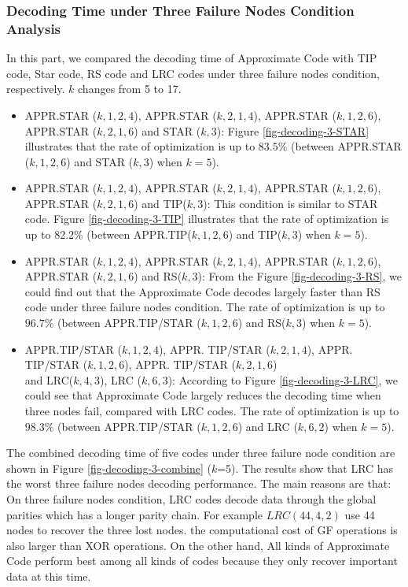 \documentclass[sigconf]{acmart}
\begin{document}
\subsubsection{Decoding Time under Three Failure Nodes Condition Analysis}
In this part, we compared the decoding time of Approximate Code with TIP code, Star code, RS code and LRC codes under three failure nodes condition, respectively. $k$ changes from 5 to 17. 
\begin{itemize}
    \item APPR.STAR ($k,1,2,4$), APPR.STAR ($k,2,1,4$), APPR.STAR ($k,1,2,6$), APPR.STAR ($k,2,1,6$) and STAR ($k,3$): Figure \ref{fig-decoding-3-STAR} illustrates that the rate of optimization is up to $83.5\%$ (between APPR.STAR ($k,1,2,6$) and STAR ($k,3$) when $k = 5$). 
    \item APPR.STAR ($k,1,2,4$), APPR.STAR ($k,2,1,4$), APPR.STAR ($k,1,2,6$), APPR.STAR ($k,2,1,6$) and TIP($k,3$): This condition is similar to STAR code. Figure \ref{fig-decoding-3-TIP} illustrates that the rate of optimization is up to 82.2\% (between APPR.TIP($k,1,2,6$) and TIP($k,3$) when $k = 5$).
    \item APPR.STAR ($k,1,2,4$), APPR.STAR ($k,2,1,4$), APPR.STAR ($k,1,2,6$), APPR.STAR ($k,2,1,6$) and RS($k,3$): From the Figure \ref{fig-decoding-3-RS}, we could find out that the Approximate Code decodes largely faster than RS code under three failure nodes condition. The rate of optimization is up to $96.7\%$ (between APPR.TIP/STAR ($k,1,2,6$) and RS($k,3$) when $k = 5$).
    \item APPR.TIP/STAR ($k,1,2,4$), APPR. TIP/STAR ($k,2,1,4$), APPR. TIP/STAR ($k,1,2,6$), APPR. TIP/STAR ($k,2,1,6$)  \\
    and LRC($k,4,3$), LRC ($k,6,3$): 
    According to Figure \ref{fig-decoding-3-LRC}, we could see that Approximate Code largely reduces the decoding time when three nodes fail, compared with LRC codes. The rate of optimization is up to $98.3\%$  (between APPR.TIP/STAR ($k,1,2,6$) and LRC ($k, 6, 2$) when $k = 5$).
\end{itemize}

The combined decoding time of five codes under three failure node condition are shown in Figure \ref{fig-decoding-3-combine} ($k$=5). The results show that LRC has the worst three failure nodes decoding performance. The main reasons are that: On three failure nodes condition, LRC codes decode data through the global parities which has a longer parity chain. For example $LRC (44,4,2)$ use 44 nodes to recover the three lost nodes. the computational cost of GF operations is also larger than XOR operations. On the other hand, All kinds of Approximate Code perform best among all kinds of codes because they only recover important data at this time.
\end{document}
